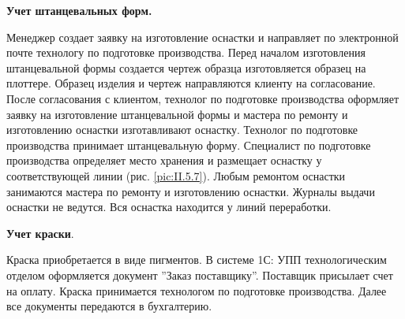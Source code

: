 





\textbf{Учет штанцевальных форм.}

Менеджер создает заявку на изготовление оснастки и направляет по электронной почте технологу по подготовке производства. Перед началом изготовления штанцевальной формы создается чертеж образца изготовляется образец на плоттере. Образец изделия и чертеж направляются клиенту на согласование. После согласования с клиентом, технолог по подготовке производства оформляет заявку на изготовление штанцевальной формы и мастера по ремонту и изготовлению оснастки изготавливают оснастку. Технолог по подготовке производства принимает штанцевальную форму. Специалист по подготовке производства определяет место хранения и размещает оснастку у соответствующей линии (рис. \ref{pic:II.5.7}).  
Любым ремонтом оснастки занимаются мастера по ремонту и изготовлению оснастки.
Журналы выдачи оснастки не ведутся. Вся оснастка находится у линий переработки.

 \textbf{Учет краски}.

 Краска приобретается в виде пигментов. В системе 1С: УПП технологическим отделом  оформляется документ ''Заказ поставщику''. Поставщик присылает счет на оплату. Краска принимается технологом по подготовке производства. Далее все документы передаются в бухгалтерию.  








